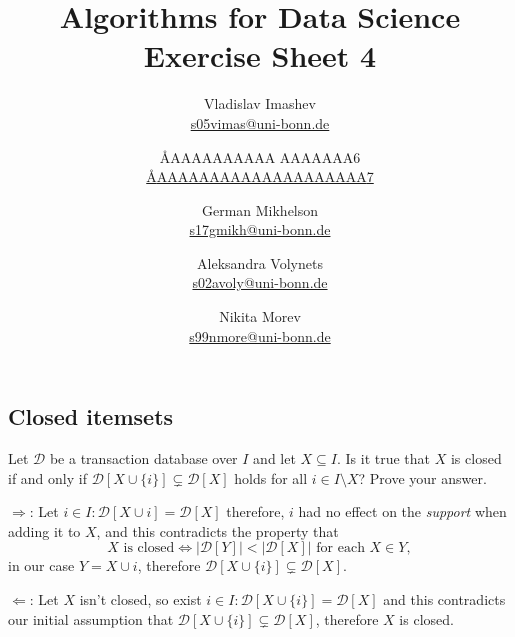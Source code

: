 \documentclass{article}
\title{Algorithms for Data Science \\ Exercise Sheet 4}
\author{
  Vladislav Imashev \\ \href{mailto:s05vimas@uni-bonn.de}{s05vimas@uni-bonn.de} \and
  \AA{AAAAAAAAAA AAAAAAA}{6} \\ \href{mailto:\AA{AAAAAAAAAAAAAAAAAAAA}{7}}{\AA{AAAAAAAAAAAAAAAAAAAA}{7}} \and
  German Mikhelson \\ \href{mailto:s17gmikh@uni-bonn.de}{s17gmikh@uni-bonn.de} \and
  Aleksandra Volynets \\ \href{mailto:s02avoly@uni-bonn.de}{s02avoly@uni-bonn.de} \and
  Nikita Morev \\ \href{mailto:s99nmore@uni-bonn.de}{s99nmore@uni-bonn.de}
}
\begin{document}
  \maketitle

  \setcounter{section}{4}
  \subsection{Closed itemsets}
  \begin{centerframebox}
    Let $\mathcal{D}$ be a transaction database over $I$ and let $X \subseteq I$. Is
    it true that $X$ is closed if and only if $\mathcal{D}[X \cup \{i\}] \subsetneq \mathcal{D}[X]$ holds for all
    $i \in I \setminus X$? Prove your answer.
  \end{centerframebox}

  $\Rightarrow$: Let $i \in I: \mathcal{D}[X \cup {i}] = \mathcal{D}[X]$ therefore, $i$ had no effect on the \textit{support} when adding it to $X$, and this contradicts the property that
  \[X\text{ is closed} \iff |\mathcal{D}[Y]| < |\mathcal{D}[X]| \text{ for each } X \in Y, \]
  in our case $Y = X \cup {i}$, therefore $\mathcal{D}[X \cup \{i\}] \subsetneq \mathcal{D}[X]$.

  $\Leftarrow$: Let $X$ isn't closed, so exist $i \in I: \mathcal{D}[X \cup \{i\}] = \mathcal{D}[X]$ and this contradicts our initial assumption that $\mathcal{D}[X \cup \{i\}] \subsetneq \mathcal{D}[X]$, therefore $X$ is closed.
\end{document}
